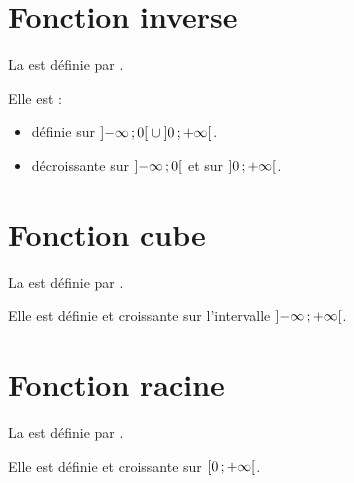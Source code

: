 \documentclass[12pt,a4paper]{article}
\begin{document}
	
	
	
	
	
	\section{Fonction inverse}
	
	\begin{mybilan}
		La  est définie par .			
		
		Elle est :
		\begin{itemize}
			\item définie sur $\mbox{\ensuremath{\left]-\infty\mathpunct{};0\right[}} \cup \mbox{\ensuremath{\left]0\mathpunct{};+\infty\right[}}$.
			\item décroissante sur $\mbox{\ensuremath{\left]- \infty\mathpunct{};0\right[}}$ et sur $\mbox{\ensuremath{\left]0\mathpunct{};+ \infty\right[}}$. 
		\end{itemize}
	\end{mybilan}
	
	
	\newpage
	
	
	
	\section{Fonction cube}
	
	
	\begin{mybilan}
		La  est définie par \kw{$x \mapsto x^3$}.		
		
		Elle est définie et croissante sur l'intervalle $\mbox{\ensuremath{\left]- \infty \mathpunct{};+ \infty\right[}}$.	
	\end{mybilan}
	
	
	
	
	
	\section{Fonction racine}
	
	\begin{mybilan}
		La  est définie par \kw{$x \mapsto \sqrt{x}$}.			
		
		Elle est définie et croissante sur $\mbox{\ensuremath{\left[0\mathpunct{};+\infty\right[}}$.
	\end{mybilan}
	
	
	
	
	
	
	
\end{document}
